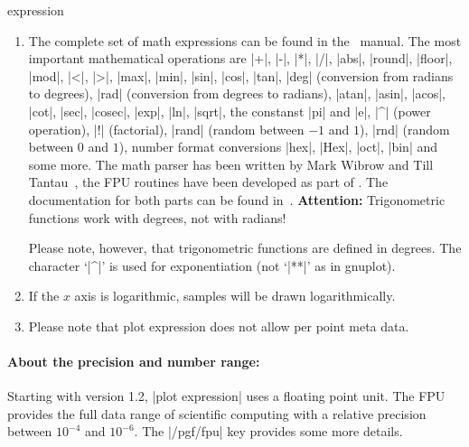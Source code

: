 \begin{addplotoperation}[]{expression }{}
\begin{enumerate}
	In short: it is the same whether you write |\x| or just |x| inside of math expressions.

	The variable name can be customized using |variable=\t|, for example. Then, |x| will be the same as |\t| (there won't be a short-hand name for user defined variable names).
%

	\item The complete set of math expressions can be found in the \PGF\ manual. The most important mathematical operations are
	|+|, |-|, |*|, |/|, |abs|, |round|, |floor|, |mod|, |<|, |>|, |max|, |min|, |sin|, |cos|, |tan|, |deg| (conversion from radians to degrees), |rad| (conversion from degrees to radians), |atan|, |asin|, |acos|, |cot|, |sec|, |cosec|, |exp|, |ln|, |sqrt|, the constanst |pi| and |e|, |^| (power operation), |!| (factorial), |rand| (random between $-1$ and $1$), |rnd| (random between $0$ and $1$), number format conversions |hex|, |Hex|, |oct|, |bin| and some more. The math parser has been written by Mark Wibrow and Till Tantau~\cite{tikz}, the FPU routines have been developed as part of \PGFPlots. The documentation for both parts can be found in~\cite{tikz}. \textbf{Attention:} Trigonometric functions work with degrees, not with radians!
	
	Please note, however, that trigonometric functions are defined in degrees. The character `|^|' is used for exponentiation (not `|**|' as in gnuplot).

	\item If the $x$ axis is logarithmic, samples will be drawn logarithmically.

	\item Please note that plot expression does not allow per point meta data.
\end{enumerate}

\paragraph{About the precision and number range:}
%
%
	 Starting with version 1.2, |plot expression| uses a floating point unit. The FPU provides the full data range of scientific computing with a relative precision between $10^{-4}$ and $10^{-6}$. The |/pgf/fpu| key provides some more details. 


\end{addplotoperation}

